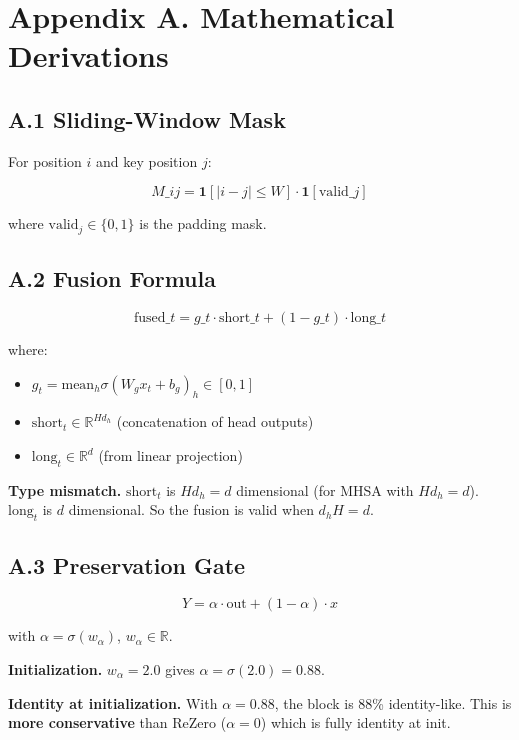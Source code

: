 
\section{Appendix A. Mathematical Derivations}

\subsection{A.1 Sliding-Window Mask}

For position $i$ and key position $j$:

\[
M\_{ij} = \mathbf{1}\left[|i - j| \leq W\right] \cdot \mathbf{1}\left[\text{valid}\_j\right]
\tag{A.1}
\]

where $\text{valid}_j \in \{0, 1\}$ is the padding mask.

\subsection{A.2 Fusion Formula}

\[
\text{fused}\_t = g\_t \cdot \text{short}\_t + (1 - g\_t) \cdot \text{long}\_t
\tag{A.2}
\]

where:
\begin{itemize}
\item $g_t = \text{mean}_h \sigma(W_g x_t + b_g)_h \in [0, 1]$
\item $\text{short}_t \in \mathbb{R}^{H d_h}$ (concatenation of head outputs)
\item $\text{long}_t \in \mathbb{R}^{d}$ (from linear projection)

\end{itemize}
\textbf{Type mismatch.} $\text{short}_t$ is $H d_h = d$ dimensional (for MHSA 
with $H d_h = d$). $\text{long}_t$ is $d$ dimensional. So the fusion is 
valid when $d_h H = d$.

\subsection{A.3 Preservation Gate}

\[
Y = \alpha \cdot \text{out} + (1 - \alpha) \cdot x
\tag{A.3}
\]

with $\alpha = \sigma(w_\alpha)$, $w_\alpha \in \mathbb{R}$.

\textbf{Initialization.} $w_\alpha = 2.0$ gives $\alpha = \sigma(2.0) = 0.88$.

\textbf{Identity at initialization.} With $\alpha = 0.88$, the block is 88\% 
identity-like. This is \textbf{more conservative} than ReZero ($\alpha = 0$) 
which is fully identity at init.


